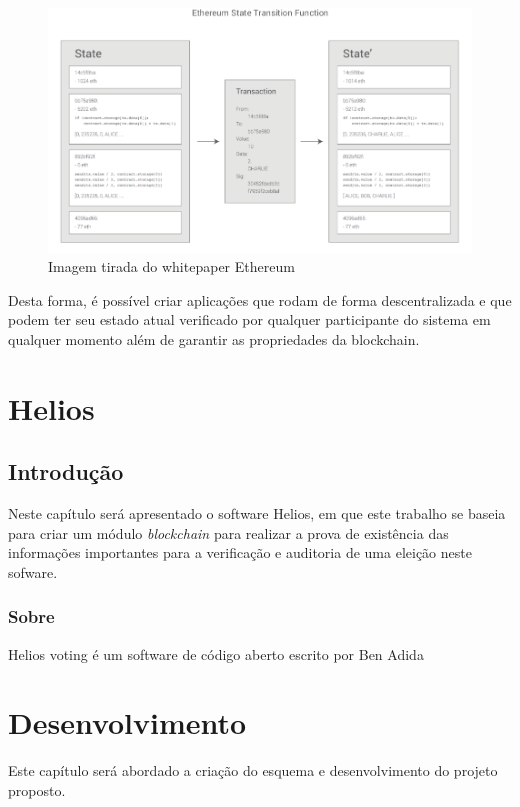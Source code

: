 \documentclass{ufsctex/ufsctex}
\begin{document}
\begin{figure}[h]
	\centering
	\includegraphics[scale=0.3]{ethereum}
	\caption{Imagem tirada do whitepaper Ethereum}
	\label{fig:ethereum}
\end{figure}

Desta forma, é possível criar aplicações que rodam de forma descentralizada e
que podem ter seu estado atual verificado por qualquer participante do sistema
em qualquer momento além de garantir as propriedades da blockchain.

\chapter{Helios}

\section{Introdução}

Neste capítulo será apresentado o software Helios, em que este trabalho se
baseia para criar um módulo \textit{blockchain} para realizar a prova de
existência das informações importantes para a verificação e auditoria de uma
eleição neste sofware.

\subsection{Sobre}

Helios voting é um software de código aberto escrito por Ben Adida

\chapter{Desenvolvimento}

Este capítulo será abordado a criação do esquema e desenvolvimento do projeto
proposto.
\end{document}
